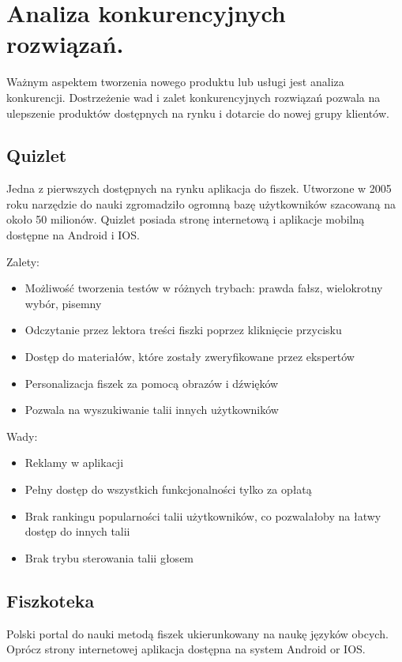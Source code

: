 \section{Analiza konkurencyjnych rozwiązań.}

Ważnym aspektem tworzenia nowego produktu lub usługi jest analiza konkurencji. Dostrzeżenie wad i zalet konkurencyjnych rozwiązań pozwala na ulepszenie produktów dostępnych na rynku i dotarcie do nowej grupy klientów.

\subsection{Quizlet}

Jedna z pierwszych dostępnych na rynku aplikacja do fiszek. Utworzone w 2005 roku narzędzie do nauki zgromadziło ogromną bazę użytkowników szacowaną na około 50 milionów. Quizlet posiada stronę internetową i aplikacje mobilną dostępne na Android i IOS.

Zalety:
\begin{itemize}[label=-]
    \item Możliwość tworzenia testów w różnych trybach: prawda fałsz, wielokrotny wybór, pisemny
    \item Odczytanie przez lektora treści fiszki poprzez kliknięcie przycisku
    \item Dostęp do materiałów, które zostały zweryfikowane przez ekspertów
    \item Personalizacja fiszek za pomocą obrazów i dźwięków
    \item Pozwala na wyszukiwanie talii innych użytkowników
    \end{itemize}

Wady:
\begin{itemize}[label=-]
    \item Reklamy w aplikacji
    \item Pełny dostęp do wszystkich funkcjonalności tylko za opłatą
    \item Brak rankingu popularności talii użytkowników, co pozwalałoby na łatwy dostęp do innych talii
    \item Brak trybu sterowania talii głosem
    \end{itemize}

\subsection{Fiszkoteka}

Polski portal do nauki metodą fiszek ukierunkowany na naukę języków obcych. Oprócz strony internetowej aplikacja dostępna na system Android or IOS.

